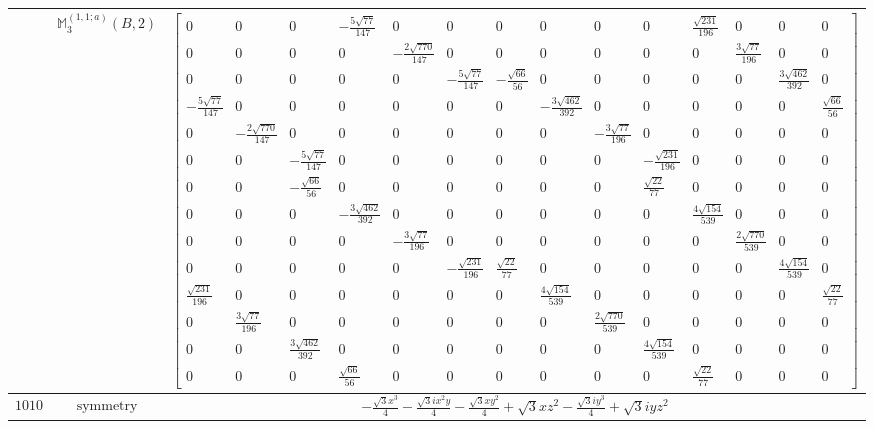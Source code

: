 \documentclass[fleqn,8pt,landscape]{jsarticle}
\begin{document}
\begin{longtable}{ccc}
$  $ & $ \mathbb{M}_{3}^{(1,1;a)}(B,2) $ & $ \begin{bmatrix} 0 & 0 & 0 & - \frac{5 \sqrt{77}}{147} & 0 & 0 & 0 & 0 & 0 & 0 & \frac{\sqrt{231}}{196} & 0 & 0 & 0 \\ 0 & 0 & 0 & 0 & - \frac{2 \sqrt{770}}{147} & 0 & 0 & 0 & 0 & 0 & 0 & \frac{3 \sqrt{77}}{196} & 0 & 0 \\ 0 & 0 & 0 & 0 & 0 & - \frac{5 \sqrt{77}}{147} & - \frac{\sqrt{66}}{56} & 0 & 0 & 0 & 0 & 0 & \frac{3 \sqrt{462}}{392} & 0 \\ - \frac{5 \sqrt{77}}{147} & 0 & 0 & 0 & 0 & 0 & 0 & - \frac{3 \sqrt{462}}{392} & 0 & 0 & 0 & 0 & 0 & \frac{\sqrt{66}}{56} \\ 0 & - \frac{2 \sqrt{770}}{147} & 0 & 0 & 0 & 0 & 0 & 0 & - \frac{3 \sqrt{77}}{196} & 0 & 0 & 0 & 0 & 0 \\ 0 & 0 & - \frac{5 \sqrt{77}}{147} & 0 & 0 & 0 & 0 & 0 & 0 & - \frac{\sqrt{231}}{196} & 0 & 0 & 0 & 0 \\ 0 & 0 & - \frac{\sqrt{66}}{56} & 0 & 0 & 0 & 0 & 0 & 0 & \frac{\sqrt{22}}{77} & 0 & 0 & 0 & 0 \\ 0 & 0 & 0 & - \frac{3 \sqrt{462}}{392} & 0 & 0 & 0 & 0 & 0 & 0 & \frac{4 \sqrt{154}}{539} & 0 & 0 & 0 \\ 0 & 0 & 0 & 0 & - \frac{3 \sqrt{77}}{196} & 0 & 0 & 0 & 0 & 0 & 0 & \frac{2 \sqrt{770}}{539} & 0 & 0 \\ 0 & 0 & 0 & 0 & 0 & - \frac{\sqrt{231}}{196} & \frac{\sqrt{22}}{77} & 0 & 0 & 0 & 0 & 0 & \frac{4 \sqrt{154}}{539} & 0 \\ \frac{\sqrt{231}}{196} & 0 & 0 & 0 & 0 & 0 & 0 & \frac{4 \sqrt{154}}{539} & 0 & 0 & 0 & 0 & 0 & \frac{\sqrt{22}}{77} \\ 0 & \frac{3 \sqrt{77}}{196} & 0 & 0 & 0 & 0 & 0 & 0 & \frac{2 \sqrt{770}}{539} & 0 & 0 & 0 & 0 & 0 \\ 0 & 0 & \frac{3 \sqrt{462}}{392} & 0 & 0 & 0 & 0 & 0 & 0 & \frac{4 \sqrt{154}}{539} & 0 & 0 & 0 & 0 \\ 0 & 0 & 0 & \frac{\sqrt{66}}{56} & 0 & 0 & 0 & 0 & 0 & 0 & \frac{\sqrt{22}}{77} & 0 & 0 & 0 \end{bmatrix} $ \\ \hline
$ 1010 $ & $ \text{symmetry} $ & $ - \frac{\sqrt{3} x^{3}}{4} - \frac{\sqrt{3} i x^{2} y}{4} - \frac{\sqrt{3} x y^{2}}{4} + \sqrt{3} x z^{2} - \frac{\sqrt{3} i y^{3}}{4} + \sqrt{3} i y z^{2} $ \\

\end{longtable}
\end{document}
